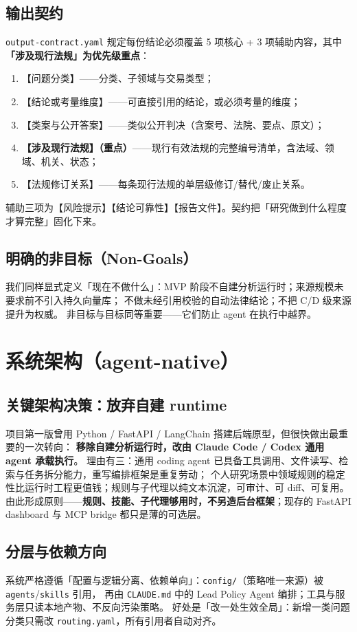 \documentclass[a4paper,11pt]{ctexart}
\newcommand{\id}[1]{\texttt{#1}}
\begin{document}
\subsection{输出契约}
\id{output-contract.yaml} 规定每份结论必须覆盖 5 项核心 + 3 项辅助内容，其中\textbf{「涉及现行法规」为优先级重点}：
\begin{enumerate}[label=\arabic*.]
\item 【问题分类】——分类、子领域与交易类型；
\item 【结论或考量维度】——可直接引用的结论，或必须考量的维度；
\item 【类案与公开答案】——类似公开判决（含案号、法院、要点、原文）；
\item \textbf{【涉及现行法规】（重点）}——现行有效法规的完整编号清单，含法域、领域、机关、状态；
\item 【法规修订关系】——每条现行法规的单层级修订/替代/废止关系。
\end{enumerate}
辅助三项为【风险提示】【结论可靠性】【报告文件】。契约把「研究做到什么程度才算完整」固化下来。

\subsection{明确的非目标（Non-Goals）}
我们同样显式定义「现在不做什么」：MVP 阶段不自建分析运行时；来源规模未要求前不引入持久向量库；
不做未经引用校验的自动法律结论；不把 C/D 级来源提升为权威。
非目标与目标同等重要——它们防止 agent 在执行中越界。

\section{系统架构（agent-native）}

\subsection{关键架构决策：放弃自建 runtime}
项目第一版曾用 Python / FastAPI / LangChain 搭建后端原型，但很快做出最重要的一次转向：
\textbf{移除自建分析运行时，改由 Claude Code / Codex 通用 agent 承载执行}。
理由有三：通用 coding agent 已具备工具调用、文件读写、检索与任务拆分能力，重写编排框架是重复劳动；
个人研究场景中领域规则的稳定性比运行时工程更值钱；规则与子代理以纯文本沉淀，可审计、可 diff、可复用。
由此形成原则——\textbf{规则、技能、子代理够用时，不另造后台框架}；现存的 FastAPI dashboard 与 MCP bridge 都只是薄的可选层。

\subsection{分层与依赖方向}
系统严格遵循「配置与逻辑分离、依赖单向」：\id{config/}（策略唯一来源）被 \id{agents}/\id{skills} 引用，
再由 \id{CLAUDE.md} 中的 Lead Policy Agent 编排；工具与服务层只读本地产物、不反向污染策略。
好处是「改一处生效全局」：新增一类问题分类只需改 \id{routing.yaml}，所有引用者自动对齐。
\end{document}
